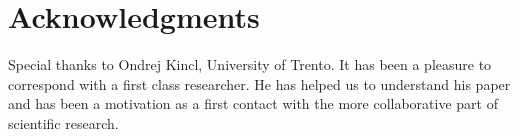 \documentclass{article}
\begin{document}
\section{Acknowledgments}

Special thanks to Ondrej Kincl, University of Trento. It has been a pleasure to correspond with a first class researcher. He has helped us to understand his paper and has been a motivation as a first contact with the more collaborative part of scientific research.

\todo{}
\end{document}

